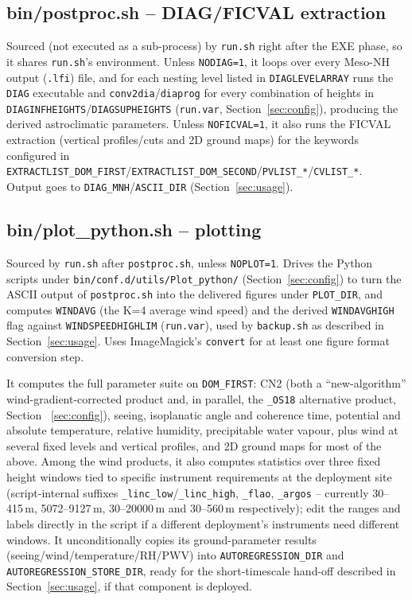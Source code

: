 \subsection{bin/postproc.sh -- DIAG/FICVAL extraction}
Sourced (not executed as a sub-process) by \texttt{run.sh} right after the EXE phase, so it shares
\texttt{run.sh}'s environment. Unless \texttt{NODIAG=1}, it loops over every Meso-NH output
(\texttt{.lfi}) file, and for each nesting level listed in \texttt{DIAGLEVELARRAY} runs the \texttt{DIAG}
executable and \texttt{conv2dia}/\texttt{diaprog} for every combination of heights in
\texttt{DIAGINFHEIGHTS}/\texttt{DIAGSUPHEIGHTS} (\texttt{run.var}, Section~\ref{sec:config}), producing
the derived astroclimatic parameters. Unless \texttt{NOFICVAL=1}, it also runs the FICVAL extraction
(vertical profiles/cuts and 2D ground maps) for the keywords configured in
\texttt{EXTRACTLIST\_DOM\_FIRST}/\texttt{EXTRACTLIST\_DOM\_SECOND}/\texttt{PVLIST\_*}/\texttt{CVLIST\_*}.\\
Output goes to \texttt{DIAG\_MNH}/\texttt{ASCII\_DIR} (Section~\ref{sec:usage}).

\subsection{bin/plot\_python.sh -- plotting}
Sourced by \texttt{run.sh} after \texttt{postproc.sh}, unless \texttt{NOPLOT=1}. Drives the Python
scripts under \texttt{bin/conf.d/utils/Plot\_python/} (Section~\ref{sec:config}) to turn the ASCII
output of \texttt{postproc.sh} into the delivered figures under \texttt{PLOT\_DIR}, and computes
\texttt{WINDAVG} (the K=4 average wind speed) and the derived \texttt{WINDAVGHIGH} flag against
\texttt{WINDSPEEDHIGHLIM} (\texttt{run.var}), used by \texttt{backup.sh} as described in
Section~\ref{sec:usage}. Uses ImageMagick's \texttt{convert} for at least one figure format conversion
step.

It computes the full parameter suite on \texttt{DOM\_FIRST}: CN2 (both a ``new-algorithm''
wind-gradient-corrected product and, in parallel, the \texttt{\_OS18} alternative product, Section~
\ref{sec:config}), seeing, isoplanatic angle and coherence time, potential and absolute temperature,
relative humidity, precipitable water vapour, plus wind at several fixed levels and vertical profiles,
and 2D ground maps for most of the above. Among the wind products, it also computes statistics over
three fixed height windows tied to specific instrument requirements at the deployment site
(script-internal suffixes \texttt{\_linc\_low}\slash\texttt{\_linc\_high}, \texttt{\_flao},
\texttt{\_argos} -- currently 30--415\,m, 5072--9127\,m, 30--20000\,m and 30--560\,m respectively); edit
the ranges and labels directly in the script if a different deployment's instruments need different
windows. It unconditionally copies its ground-parameter results (seeing/wind/temperature/RH/PWV) into
\texttt{AUTOREGRESSION\_DIR} and \texttt{AUTOREGRESSION\_STORE\_DIR}, ready for the short-timescale
hand-off described in Section~\ref{sec:usage}, if that component is deployed.

